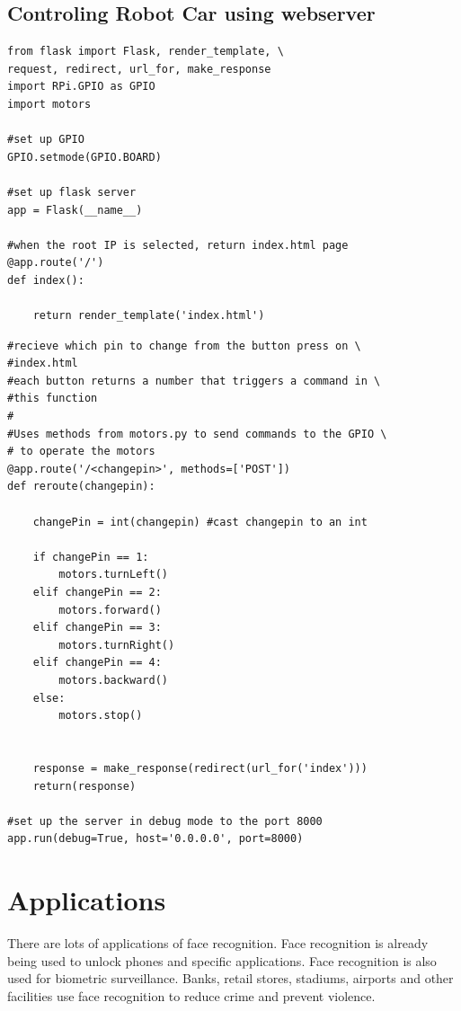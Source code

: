 \documentclass[sigconf]{acmart}
\begin{document}
\subsection{Controling Robot Car using webserver}
\begin{verbatim}
from flask import Flask, render_template, \ 
request, redirect, url_for, make_response
import RPi.GPIO as GPIO
import motors

#set up GPIO
GPIO.setmode(GPIO.BOARD) 

#set up flask server
app = Flask(__name__) 

#when the root IP is selected, return index.html page
@app.route('/')
def index():

	return render_template('index.html')
\end{verbatim}

\begin{verbatim}
#recieve which pin to change from the button press on \ 
#index.html
#each button returns a number that triggers a command in \ 
#this function
#
#Uses methods from motors.py to send commands to the GPIO \ 
# to operate the motors
@app.route('/<changepin>', methods=['POST'])
def reroute(changepin):

	changePin = int(changepin) #cast changepin to an int

	if changePin == 1:
		motors.turnLeft()
	elif changePin == 2:
		motors.forward()
	elif changePin == 3:
		motors.turnRight()
	elif changePin == 4:
		motors.backward()
	else:
		motors.stop()


	response = make_response(redirect(url_for('index')))
	return(response)

#set up the server in debug mode to the port 8000
app.run(debug=True, host='0.0.0.0', port=8000) 
\end{verbatim}

\section{Applications}
There are lots of applications of face recognition. Face recognition is already being used to unlock phones and specific applications. Face recognition is also used for biometric surveillance. Banks, retail stores, stadiums, airports and other facilities use face recognition to reduce crime and prevent violence.
\end{document}
